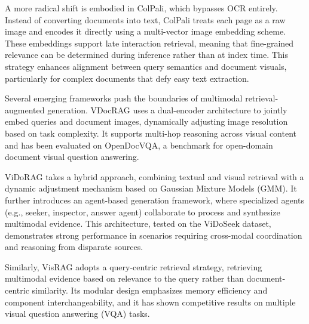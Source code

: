 \documentclass[12pt,twoside]{report}
\begin{document}
A more radical shift is embodied in ColPali\cite{ColPali}, which bypasses OCR entirely. Instead of converting documents into text, ColPali treats each page as a raw image and encodes it directly using a multi-vector image embedding scheme. These embeddings support late interaction retrieval, meaning that fine-grained relevance can be determined during inference rather than at index time. This strategy enhances alignment between query semantics and document visuals, particularly for complex documents that defy easy text extraction.

Several emerging frameworks push the boundaries of multimodal retrieval-augmented generation. VDocRAG\cite{VDocRAG} uses a dual-encoder architecture to jointly embed queries and document images, dynamically adjusting image resolution based on task complexity. It supports multi-hop reasoning across visual content and has been evaluated on OpenDocVQA, a benchmark for open-domain document visual question answering.

ViDoRAG\cite{ViDoRAG} takes a hybrid approach, combining textual and visual retrieval with a dynamic adjustment mechanism based on Gaussian Mixture Models (GMM). It further introduces an agent-based generation framework, where specialized agents (e.g., seeker, inspector, answer agent) collaborate to process and synthesize multimodal evidence. This architecture, tested on the ViDoSeek dataset, demonstrates strong performance in scenarios requiring cross-modal coordination and reasoning from disparate sources.

Similarly, VisRAG\cite{VisRAG} adopts a query-centric retrieval strategy, retrieving multimodal evidence based on relevance to the query rather than document-centric similarity. Its modular design emphasizes memory efficiency and component interchangeability, and it has shown competitive results on multiple visual question answering (VQA) tasks.
\end{document}
